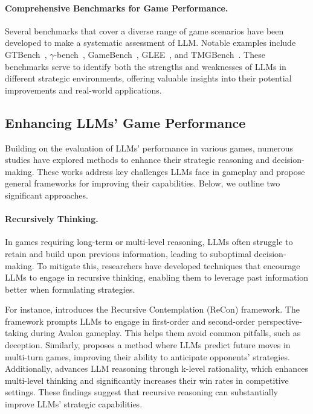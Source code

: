 \paragraph{Comprehensive Benchmarks for Game Performance.}
Several benchmarks that cover a diverse range of game scenarios have been developed to make a systematic assessment of LLM. 
Notable examples include GTBench~\cite{duan2024gtbench}, $\gamma$-bench~\cite{huang2024far}, GameBench~\cite{hua2024game}, GLEE~\cite{shapira2024glee}, and TMGBench~\cite{wang2024tmgbench}. 
These benchmarks serve to identify both the strengths and weaknesses of LLMs in different strategic environments, offering valuable insights into their potential improvements and real-world applications.


\subsection{Enhancing LLMs' Game Performance} \label{sec:llm_play_game_align}
Building on the evaluation of LLMs' performance in various games, numerous studies have explored methods to enhance their strategic reasoning and decision-making. These works address key challenges LLMs face in gameplay and propose general frameworks for improving their capabilities. Below, we outline two significant approaches.

\paragraph{Recursively Thinking.}
In games requiring long-term or multi-level reasoning, LLMs often struggle to retain and build upon previous information, leading to suboptimal decision-making. To mitigate this, researchers have developed techniques that encourage LLMs to engage in recursive thinking, enabling them to leverage past information better when formulating strategies.

For instance, \cite{wang2023avalon} introduces the Recursive Contemplation (ReCon) framework. The framework prompts LLMs to engage in first-order and second-order perspective-taking during Avalon gameplay. This helps them avoid common pitfalls, such as deception. Similarly, \cite{duan2024reta} proposes a method where LLMs predict future moves in multi-turn games, improving their ability to anticipate opponents' strategies.
Additionally, \cite{zhang2024k} advances LLM reasoning through k-level rationality, which enhances multi-level thinking and significantly increases their win rates in competitive settings. These findings suggest that recursive reasoning can substantially improve LLMs' strategic capabilities.

